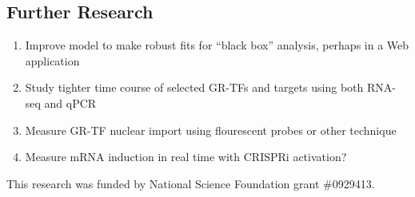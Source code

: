 \documentclass[aspb,landscape]{a0poster}
\begin{document}
\begin{multicols}{4}

  \section*{Further Research}
  
  \begin{enumerate}
  \item Improve model to make robust fits for ``black box'' analysis, perhaps in a Web application
  \item Study tighter time course of selected GR-TFs and targets using both RNA-seq and qPCR
  \item Measure GR-TF nuclear import using flourescent probes or other technique
  \item Measure mRNA induction in real time with CRISPRi activation?
  \end{enumerate}


  \nocite{*} %


  {\small This research was funded by National Science Foundation grant \#0929413.}
  
  
\end{multicols}
\end{document}
